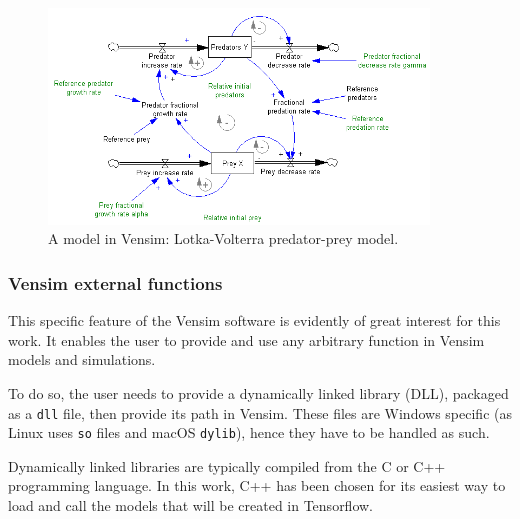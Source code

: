 \begin{figure}[h!]
    \includegraphics[width=0.9\textwidth]{resources/images/vensim-model-example.png}
    \caption{A model in Vensim: Lotka-Volterra predator-prey model.}
    \label{fig:vensim-model-example}
\end{figure}

\subsubsection{Vensim external functions}

This specific feature of the Vensim software is evidently of great interest for this work. It enables the user to provide and use any arbitrary function in Vensim models and simulations.

To do so, the user needs to provide a dynamically linked library (DLL), packaged as a \texttt{dll} file, then provide its path in Vensim. These files are Windows specific (as Linux uses \texttt{so} files and macOS \texttt{dylib}), hence they have to be handled as such.

Dynamically linked libraries are typically compiled from the C or C++ programming language. In this work, C++ has been chosen for its easiest way to load and call the models that will be created in Tensorflow.

